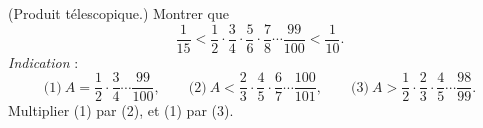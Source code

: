 (Produit télescopique.) Montrer que
\[ \frac{1}{15} < \frac{1}{2} \cdot \frac{3}{4} \cdot \frac{5}{6} \cdot \frac{7}{8} \cdots \frac{99}{100} < \frac{1}{10}. \]
\emph{Indication} :
\[ \text{(1)}\ A = \frac{1}{2} \cdot \frac{3}{4} \cdots \frac{99}{100},\qquad \text{(2)}\ A < \frac{2}{3} \cdot \frac{4}{5} \cdot \frac{6}{7} \cdots \frac{100}{101},\qquad \text{(3)}\ A > \frac{1}{2} \cdot \frac{2}{3} \cdot \frac{4}{5} \cdots \frac{98}{99}. \]
Multiplier (1) par (2), et (1) par (3).
